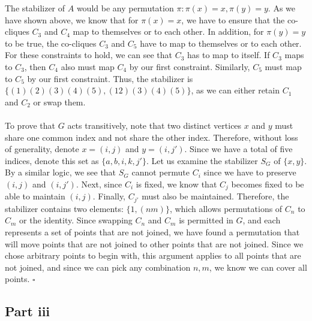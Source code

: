 \documentclass[letterpaper]{article}
\newcommand*{\QED}{\hfill\ensuremath{\square}}%
\begin{document}
The stabilizer of $ A $ would be any permutation $ \pi : \pi(x) = x, \pi(y) = y $.
As we have shown above, we know that for $ \pi(x) = x $, we have to ensure that the co-cliques $ C_3 $ and $ C_4 $ map to themselves or to each other.
In addition, for $ \pi(y) = y $ to be true, the co-cliques $ C_3 $ and $ C_5 $ have to map to themselves or to each other.
For these constraints to hold, we can see that $ C_3 $ has to map to itself.
If $ C_3 $ maps to $ C_3 $, then $ C_4 $ also must map $ C_4 $ by our first constraint.
Similarly, $ C_5 $ must map to $ C_5 $ by our first constraint.
Thus, the stabilizer is $ \{(1)(2)(3)(4)(5), (12)(3)(4)(5)\} $, as we can either retain $ C_1 $ and $ C_2 $ or swap them.
\\ \\
To prove that $ G $ acts transitively, note that two distinct vertices $ x $ and $ y $ must share one common index and not share the other index.
Therefore, without loss of generality, denote $ x = (i, j) $ and $ y = (i, j') $.
Since we have a total of five indices, denote this set as $ \{a, b, i, k , j'\} $.
Let us examine the stabilizer $ S_G $ of $ \{x, y\} $.
By a similar logic, we see that $ S_G $ cannot permute $ C_i $ since we have to preserve $ (i, j) $ and $ (i, j') $.
Next, since $ C_i $ is fixed, we know that $ C_j $ becomes fixed to be able to maintain $ (i, j) $.
Finally, $ C_{j'} $ must also be maintained.
Therefore, the stabilizer contains two elements: $ \{1, (nm) \} $, which allows permutations of $ C_n $ to $ C_m $ or the identity.
Since swapping $ C_n $ and $ C_m $ is permitted in $ G $, and each represents a set of points that are not joined, we have found a permutation that will move points that are not joined to other points that are not joined.
Since we chose arbitrary points to begin with, this argument applies to all points that are not joined, and since we can pick any combination $ n, m $, we know we can cover all points.
\QED{}

\subsection{Part iii}
\label{subs:2Partiii}
\end{document}
